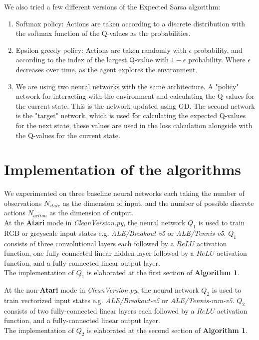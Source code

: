 \documentclass{article}
\begin{document}
We also tried a few different versions of the Expected Sarsa algorithm:
\begin{enumerate}
    \item Softmax policy: Actions are taken according to a discrete distribution with the softmax function of the Q-values as the probabilities.
    \item Epsilon greedy policy: Actions are taken randomly with $\epsilon$ probability, and according to the index of the largest Q-value with $1-\epsilon$ probability. Where $\epsilon$ decreases over time, as the agent explores the environment.
    \item We are using two neural networks with the same architecture. A "policy" network for interacting with the environment and calculating the Q-values for the current state. This is the network updated using GD. The second network is the "target" network, which is used for calculating the expected Q-values for the next state, these values are used in the loss calculation alongside with the Q-values for the current state.
\end{enumerate}

\section{Implementation of the algorithms}

We experimented on three baseline neural networks each taking the number of observations $N_{state}$ as the dimension of input, and the number of possible discrete actions $N_{action}$ as the dimension of output. \\
At the \textbf{Atari} mode in \textit{CleanVersion.py}, the neural network $Q_1$ is used to train RGB or greyscale input states 
e.g. \textit{ALE/Breakout-v5} or \textit{ALE/Tennis-v5}. 
$Q_1$ consists of three convolutional layers each followed by a $ReLU$ activation function, 
one fully-connected linear hidden layer followed by a $ReLU$ activation function, 
and a fully-connected linear output layer. \\
The implementation of $Q_1$ is elaborated at the first section of \textbf{Algorithm 1}.

At the non-\textbf{Atari} mode in \textit{CleanVersion.py}, the neural network $Q_2$ is used to train vectorized input states 
e.g. \textit{ALE/Breakout-v5} or \textit{ALE/Tennis-ram-v5}. 
$Q_2$ consists of two fully-connected linear layers each followed by a $ReLU$ activation function, 
and a fully-connected linear output layer. \\
The implementation of $Q_2$ is elaborated at the second section of \textbf{Algorithm 1}.
\end{document}
